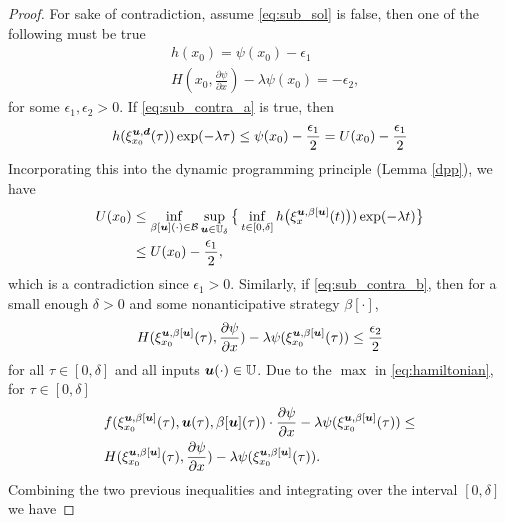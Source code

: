 \begin{for_journal}
\begin{proof}
For sake of contradiction, assume \eqref{eq:sub_sol} is false, then one of the following must be true
%
\begin{subequations}
\begin{align}
&h(x_0) = \psi(x_0) - \epsilon_1 \label{eq:sub_contra_a}\\
&H(x_0,\frac{\partial \psi}{\partial x}) - \lambda \psi(x_0) = -\epsilon_2 \label{eq:sub_contra_b},
\end{align} 
\end{subequations}
%
for some $\epsilon_1, \epsilon_2 > 0$. If \eqref{eq:sub_contra_a} is true, then 
%
\begin{equation}
h(\xi_{x_0}^{\bm{u}, \bm{d}}(\tau))\exp(-\lambda \tau) \leq \psi(x_0) - \frac{\epsilon_1}{2} = U(x_0) - \frac{\epsilon_1}{2}
\end{equation}
%
Incorporating this into the dynamic programming principle (Lemma \ref{dpp}), we have 
%
\begin{equation}
\begin{split}
U(x_0) &\leq \inf_{\beta[\bm{u}](\cdot) \in \mathcal{B}} \sup_{\bm{u} \in \mathbb{U}_\delta}
\big \{\inf_{t \in [0, \delta]} h\big(\xi_{x}^{\bm{u},\beta[\bm{u}]}(t)\big))\exp(-\lambda  t) \big \} \\&\leq U(x_0) - \frac{\epsilon_1}{2},
\end{split}
\end{equation}
%
which is a contradiction since $\epsilon_1>0$. Similarly, if \eqref{eq:sub_contra_b}, then for a small enough $\delta>0$ and some nonanticipative strategy $\beta[\cdot]$, 
%
\begin{equation}
H(\xi_{x_0}^{\bm{u},\beta[\bm{u}]}(\tau), \frac{\partial \psi}{\partial x}) - \lambda \psi(\xi_{x_0}^{\bm{u},\beta[\bm{u}]}(\tau)) \leq \frac{\epsilon_2}{2}
\end{equation}
%
for all $\tau \in [0,\delta]$ and all inputs $\bm{u}(\cdot) \in \mathbb{U}$. Due to the $\max{}$ in \eqref{eq:hamiltonian}, for $\tau \in [0,\delta]$
%
\begin{equation}
\begin{split}
&f(\xi_{x_0}^{\bm{u},\beta[\bm{u}]}(\tau),\bm{u}(\tau), \beta[\bm{u}](\tau)) \cdot \frac{\partial \psi}{\partial x} - \lambda \psi(\xi_{x_0}^{\bm{u},\beta[\bm{u}]}(\tau)) \leq \\ &H(\xi_{x_0}^{\bm{u},\beta[\bm{u}]}(\tau), \frac{\partial \psi}{\partial x}) - \lambda \psi(\xi_{x_0}^{\bm{u},\beta[\bm{u}]}(\tau)).
\end{split}
\end{equation}
%
Combining the two previous inequalities and integrating over the interval $[0,\delta]$ we have

\end{proof}
\end{for_journal}
